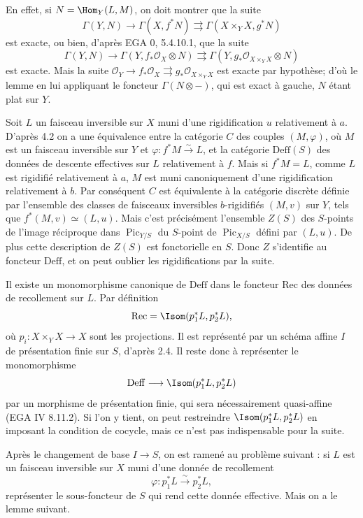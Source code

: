 \documentclass[11pt]{article}
\providecommand{\Pic}{\operatorname{Pic}}
\begin{document}
En effet, si \(N=\Hom_Y(L,M)\), on doit montrer que la suite
\[
  \Gamma(Y,N)\longrightarrow\Gamma(X,f^*N)
  \rightrightarrows
  \Gamma(X\times_YX,g^*N)
\]
est exacte, ou bien, d'après EGA 0, 5.4.10.1, que la suite
\[
  \Gamma(Y,N)\longrightarrow\Gamma(Y,f_*\mathcal O_X\otimes N)
  \rightrightarrows
  \Gamma(Y,g_*\mathcal O_{X\times_YX}\otimes N)
\]
est exacte. Mais la suite \(\mathcal O_Y\to f_*\mathcal O_X\rightrightarrows g_*\mathcal O_{X\times_YX}\) est exacte par hypothèse; d'où le lemme en lui appliquant le foncteur \(\Gamma(N\otimes -)\), qui est exact à gauche, \(N\) étant plat sur \(Y\).

Soit \(L\) un faisceau inversible sur \(X\) muni d'une rigidification \(u\) relativement à \(a\). D'après 4.2 on a une équivalence entre la catégorie \(C\) des couples \((M,\varphi)\), où \(M\) est un faisceau inversible sur \(Y\) et \(\varphi:f^*M\xrightarrow{\sim}L\), et la catégorie \(\mathrm{Deff}(S)\) des données de descente effectives sur \(L\) relativement à \(f\). Mais si \(f^*M=L\), comme \(L\) est rigidifié relativement à \(a\), \(M\) est muni canoniquement d'une rigidification relativement à \(b\). Par conséquent \(C\) est équivalente à la catégorie discrète définie par l'ensemble des classes de faisceaux inversibles \(b\)-rigidifiés \((M,v)\) sur \(Y\), tels que \(f^*(M,v)\simeq(L,u)\). Mais c'est précisément l'ensemble \(Z(S)\) des \(S\)-points de l'image réciproque dans \(\Pic_{Y/S}\) du \(S\)-point de \(\Pic_{X/S}\) défini par \((L,u)\). De plus cette description de \(Z(S)\) est fonctorielle en \(S\). Donc \(Z\) s'identifie au foncteur \(\mathrm{Deff}\), et on peut oublier les rigidifications par la suite.

Il existe un monomorphisme canonique de \(\mathrm{Deff}\) dans le foncteur \(\mathrm{Rec}\) des données de recollement sur \(L\). Par définition
\[
  \mathrm{Rec}=\Isom(p_1^*L,p_2^*L),
\]
où \(p_i:X\times_YX\to X\) sont les projections. Il est représenté par un schéma affine \(I\) de présentation finie sur \(S\), d'après 2.4. Il reste donc à représenter le monomorphisme
\[
  \mathrm{Deff}\longrightarrow \Isom(p_1^*L,p_2^*L)
\]
par un morphisme de présentation finie, qui sera nécessairement quasi-affine (EGA IV 8.11.2). Si l'on y tient, on peut restreindre \(\Isom(p_1^*L,p_2^*L)\) en imposant la condition de cocycle, mais ce n'est pas indispensable pour la suite.

Après le changement de base \(I\to S\), on est ramené au problème suivant : si \(L\) est un faisceau inversible sur \(X\) muni d'une donnée de recollement
\[
  \varphi:p_1^*L\xrightarrow{\sim}p_2^*L,
\]
représenter le sous-foncteur de \(S\) qui rend cette donnée effective. Mais on a le lemme suivant.
\end{document}
